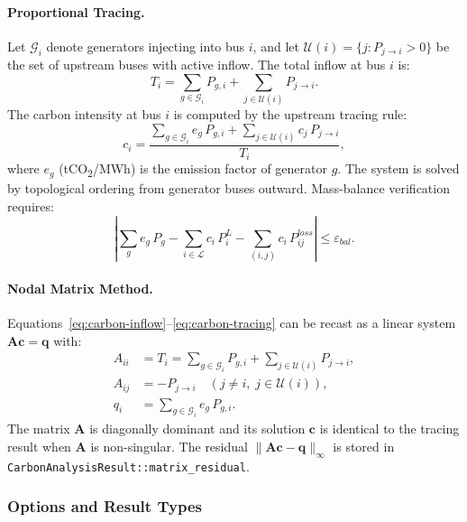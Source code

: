 \paragraph{Proportional Tracing.}
Let $\mathcal{G}_i$ denote generators injecting into bus $i$, and let
$\mathcal{U}(i) = \{j : P_{j\to i} > 0\}$ be the set of upstream buses
with active inflow.  The total inflow at bus $i$ is:
\begin{equation}
  T_i = \sum_{g \in \mathcal{G}_i} P_{g,i} + \sum_{j \in \mathcal{U}(i)} P_{j\to i}.
  \label{eq:carbon-inflow}
\end{equation}
The carbon intensity at bus $i$ is computed by the upstream tracing rule:
\begin{equation}
  c_i = \frac{\sum_{g \in \mathcal{G}_i} e_g\,P_{g,i}
              + \sum_{j \in \mathcal{U}(i)} c_j\,P_{j\to i}}{T_i},
  \label{eq:carbon-tracing}
\end{equation}
where $e_g$ (tCO\textsubscript{2}/MWh) is the emission factor of generator $g$.
The system is solved by topological ordering from generator buses outward.
Mass-balance verification requires:
\begin{equation}
  \left|\sum_{g} e_g\,P_g - \sum_{i\in\mathcal{L}} c_i\,P_i^L
        - \sum_{(i,j)} c_i\,P_{ij}^{loss}\right| \leq \varepsilon_{bal}.
\end{equation}

\paragraph{Nodal Matrix Method.}
Equations~\eqref{eq:carbon-inflow}--\eqref{eq:carbon-tracing} can be
recast as a linear system $\mathbf{A}\mathbf{c} = \mathbf{q}$ with:
\begin{align}
  A_{ii} &= T_i = \sum_{g\in\mathcal{G}_i} P_{g,i}
                  + \sum_{j\in\mathcal{U}(i)} P_{j\to i}, \\
  A_{ij} &= -P_{j\to i} \quad (j \neq i,\; j \in \mathcal{U}(i)), \\
  q_i    &= \sum_{g\in\mathcal{G}_i} e_g\,P_{g,i}.
\end{align}
The matrix $\mathbf{A}$ is diagonally dominant and its solution $\mathbf{c}$
is identical to the tracing result when $\mathbf{A}$ is non-singular.
The residual $\|\mathbf{A}\mathbf{c} - \mathbf{q}\|_\infty$ is stored in
\texttt{CarbonAnalysisResult::matrix\_residual}.

\subsubsection{Options and Result Types}

